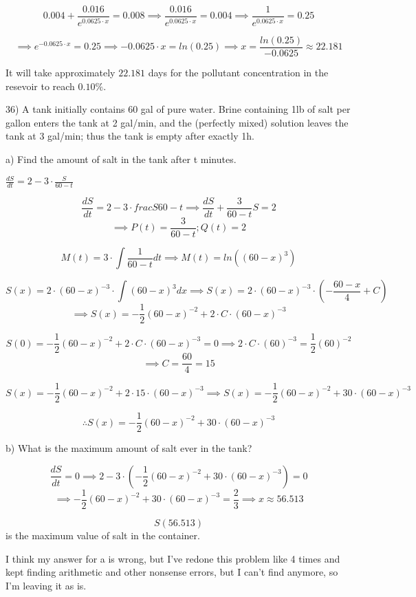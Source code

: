 \documentclass{article}
\begin{document}
\[0.004 + \frac{0.016}{e^{0.0625 \cdot x}} = 0.008
\implies \frac{0.016}{e^{0.0625 \cdot x}} = 0.004
\implies \frac{1}{e^{0.0625 \cdot x}} = 0.25\]

\[\implies e^{-0.0625 \cdot x} = 0.25
\implies -0.0625 \cdot x = ln(0.25)
\implies x = \frac{ln(0.25)}{-0.0625} \approx 22.181\]

It will take approximately $22.181$ days for the pollutant concentration
in the resevoir to reach $0.10\%$.


36) A tank initially contains 60 gal of pure water. Brine
containing 1lb of salt per gallon enters the tank at 2 gal/min, and
the (perfectly mixed) solution leaves the tank at 3 gal/min; thus the tank
is empty after exactly 1h.

a) Find the amount of salt in the tank after t minutes.

$\frac{dS}{dt} = 2 - 3 \cdot \frac{S}{60-t}$

\[\frac{dS}{dt} = 2 - 3 \cdot frac{S}{60-t}
\implies \frac{dS}{dt} + \frac{3}{60-t} S = 2\]
\[\implies P(t) = \frac{3}{60-t}; Q(t) = 2\]

\[M(t) = 3 \cdot \int \frac{1}{60-t} dt
\implies M(t) = ln((60-x)^3)\]

\[S(x) = 2 \cdot (60-x)^{-3} \cdot \int (60-x)^3 dx
\implies S(x) = 2 \cdot (60-x)^{-3} \cdot (-\frac{60-x}{4} + C)\]
\[\implies S(x) = -\frac{1}{2}(60-x)^{-2} + 2 \cdot C \cdot (60-x)^{-3}\]

\[S(0) = -\frac{1}{2}(60-x)^{-2} + 2 \cdot C \cdot (60-x)^{-3} = 0
\implies 2 \cdot C \cdot (60)^{-3} = \frac{1}{2}(60)^{-2}\]
\[\implies C = \frac{60}{4} = 15\]

\[S(x) = -\frac{1}{2}(60-x)^{-2} + 2 \cdot 15 \cdot (60-x)^{-3}
\implies S(x) = -\frac{1}{2}(60-x)^{-2} + 30 \cdot (60-x)^{-3}\]

\[\therefore S(x) = -\frac{1}{2}(60-x)^{-2} + 30 \cdot (60-x)^{-3}\]


b) What is the maximum amount of salt ever in the tank?

\[\frac{dS}{dt} = 0
\implies 2 - 3 \cdot (-\frac{1}{2}(60-x)^{-2} + 30 \cdot (60-x)^{-3}) = 0\]
\[\implies -\frac{1}{2}(60-x)^{-2} + 30 \cdot (60-x)^{-3} = \frac{2}{3}
\implies x \approx 56.513\]

\[S(56.513)\] is the maximum value of salt in the container.


I think my answer for a is wrong, but I've redone this problem like 4 times
and kept finding arithmetic and other nonsense errors,
but I can't find anymore, so I'm leaving it as is.
\end{document}
